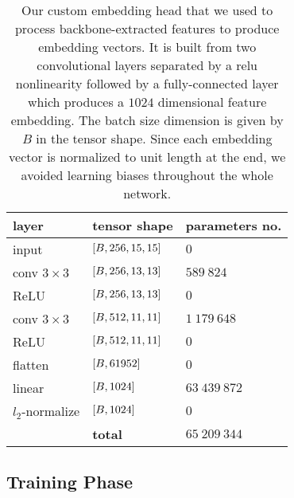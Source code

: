 \begin{table}[t]
    \centering
    \begin{tabular}{lll}
        \toprule
        \textbf{layer}    & \textbf{tensor shape}        & \textbf{parameters no.} \\
        \midrule
        input             & $\left[ {B, 256, 15, 15} \right]$ & $0$                     \\
        \midrule
        conv $3 \times 3$ & $\left[ {B, 256, 13, 13} \right]$ & $589\ 824$              \\
        ReLU              & $\left[ {B, 256, 13, 13} \right]$ & $0$                     \\
        \midrule
        conv $3 \times 3$ & $\left[ {B, 512, 11, 11} \right]$ & $1\ 179\ 648$           \\
        ReLU              & $\left[ {B, 512, 11, 11} \right]$ & $0$                     \\
        \midrule
        flatten           & $\left[ {B, 61952} \right]$       & $0$                     \\
        linear            & $\left[ {B, 1024} \right]$        & $63\ 439\ 872$          \\
        \midrule
        $l_2$-normalize   & $\left[ {B, 1024} \right]$        & $0$                     \\
        \bottomrule
                          & \textbf{total}               & $65\ 209\ 344$          \\
        \cline{2-3}
    \end{tabular}
    \caption[Feature embedding head]{Our custom embedding head that we used to process backbone-extracted features to produce embedding vectors. It is built from two convolutional layers separated by a \gls{relu} nonlinearity followed by a fully-connected layer which produces a $1024$ dimensional feature embedding. The batch size dimension is given by $B$ in the tensor shape. Since each embedding vector is normalized to unit length at the end, we avoided learning biases throughout the whole network.}
    \label{tab:FeatureEmbeddingHead}
\end{table}

\subsection{Training Phase}

